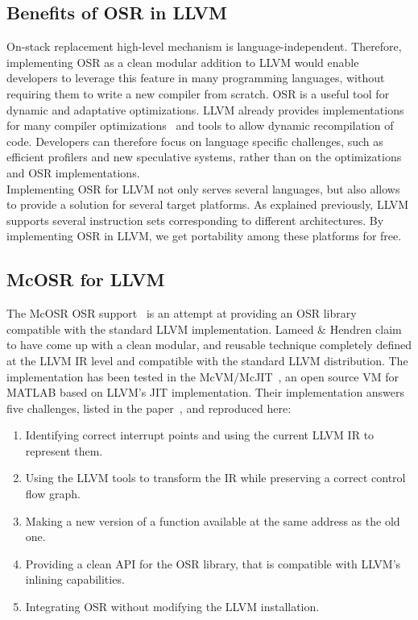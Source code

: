 \subsection{Benefits of OSR in LLVM}

On-stack replacement high-level mechanism is language-independent.
Therefore, implementing OSR as a clean modular addition to LLVM would enable developers to leverage this feature in many programming languages, without requiring them to write a new compiler from scratch.
OSR is a useful tool for dynamic and adaptative optimizations.
LLVM already provides implementations for many compiler optimizations~\cite{llvmUrl} and tools to allow dynamic recompilation of code.
Developers can therefore focus on language specific challenges, such as efficient profilers and new speculative systems, rather than on the optimizations and OSR implementations.\\

Implementing OSR for LLVM not only serves several languages, but also allows to provide a solution for several target platforms.
As explained previously, LLVM supports several instruction sets corresponding to different architectures.
By implementing OSR in LLVM, we get portability among these platforms for free.\\

\subsection{McOSR for LLVM}\label{McOSR}
The McOSR OSR support~\cite{lameed2013modular} is an attempt at providing an OSR library compatible with the standard LLVM implementation. 
Lameed \& Hendren claim to have come up with a clean modular, and reusable technique completely defined at the LLVM IR level and compatible with the standard LLVM distribution.
The implementation has been tested in the McVM/McJIT~\cite{chevalier2010optimizing, McVM}, an open source VM for MATLAB based on LLVM's JIT implementation.
Their implementation answers five challenges, listed in the paper~\cite{lameed2013modular}, and reproduced here:\\ 

\begin{enumerate}
    \item Identifying correct interrupt points and using the current LLVM IR to represent them.
    \item Using the LLVM tools to transform the IR while preserving a correct control flow graph. 
    \item Making a new version of a function available at the same address as the old one.
    \item Providing a clean API for the OSR library, that is compatible with LLVM's inlining capabilities.
    \item Integrating OSR without modifying the LLVM installation.
\end{enumerate}

